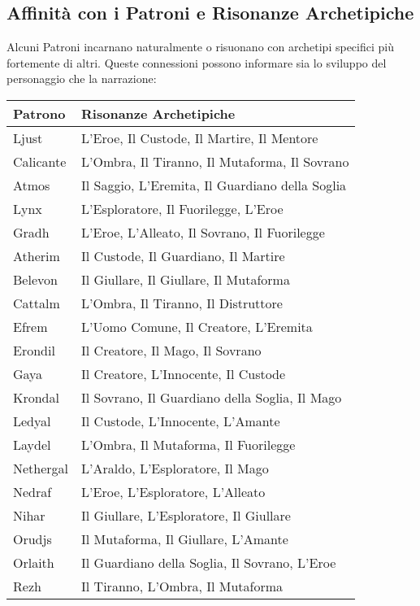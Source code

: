\begin{multicols}{2}
\subsection*{Affinità con i Patroni e Risonanze Archetipiche}

Alcuni Patroni incarnano naturalmente o risuonano con archetipi specifici più fortemente di altri. Queste connessioni possono informare sia lo sviluppo del personaggio che la narrazione:

\noindent\begin{tabularx}{\columnwidth}{lX}
\toprule
\textbf{Patrono} & \textbf{Risonanze Archetipiche} \\
\midrule
Ljust & L'Eroe, Il Custode, Il Martire, Il Mentore \\
\hline
Calicante & L'Ombra, Il Tiranno, Il Mutaforma, Il Sovrano \\
\hline
Atmos & Il Saggio, L'Eremita, Il Guardiano della Soglia \\
\hline
Lynx & L'Esploratore, Il Fuorilegge, L'Eroe \\
\hline
Gradh & L'Eroe, L'Alleato, Il Sovrano, Il Fuorilegge \\
\hline
Atherim & Il Custode, Il Guardiano, Il Martire \\
\hline
Belevon & Il Giullare, Il Giullare, Il Mutaforma \\
\hline
Cattalm & L'Ombra, Il Tiranno, Il Distruttore \\
\hline
Efrem & L'Uomo Comune, Il Creatore, L'Eremita \\
\hline
Erondil & Il Creatore, Il Mago, Il Sovrano \\
\hline
Gaya & Il Creatore, L'Innocente, Il Custode \\
\hline
Krondal & Il Sovrano, Il Guardiano della Soglia, Il Mago \\
\hline
Ledyal & Il Custode, L'Innocente, L'Amante \\
\hline
Laydel & L'Ombra, Il Mutaforma, Il Fuorilegge \\
\hline
Nethergal & L'Araldo, L'Esploratore, Il Mago \\
\hline
Nedraf & L'Eroe, L'Esploratore, L'Alleato \\
\hline
Nihar & Il Giullare, L'Esploratore, Il Giullare \\
\hline
Orudjs & Il Mutaforma, Il Giullare, L'Amante \\
\hline
Orlaith & Il Guardiano della Soglia, Il Sovrano, L'Eroe \\
\hline
Rezh & Il Tiranno, L'Ombra, Il Mutaforma \\

\end{tabularx}
\end{multicols}

